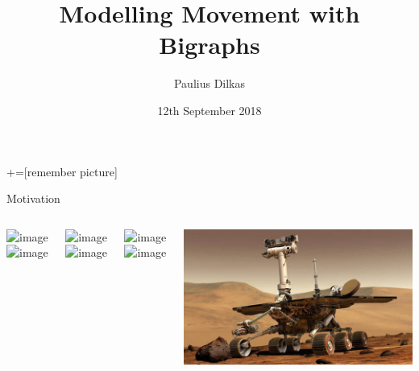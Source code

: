 \documentclass{beamer}
\author{Paulius Dilkas}
\title{Modelling Movement with Bigraphs}
\institute[]{School of Computing Science}
\date{12th September 2018}
\begin{document}
\maketitle
{}+=[remember picture]

\begin{frame}{Motivation}
  \begin{columns}[t]
    \centering
    \begin{overlayarea}{\textwidth}{0.5\textheight}
      \includegraphics<-2>[width=\textwidth]{uav.jpg}
      \includegraphics<3->[width=\textwidth]{drone.jpg}
    \end{overlayarea}
    \begin{overlayarea}{\textwidth}{0.5\textheight}
      \includegraphics<-3>[width=\textwidth]{underwater.jpg}
      \includegraphics<4->[width=\textwidth]{boat.png}
    \end{overlayarea}
    \centering
    \begin{overlayarea}{\textwidth}{0.5\textheight}
      \includegraphics<1>[width=\textwidth]{ground.jpg}
      \includegraphics<2->[width=\textwidth]{car.jpg}
    \end{overlayarea}
    \includegraphics[width=\textwidth]{rover.jpg}
  \end{columns}
\end{frame}
\end{document}
